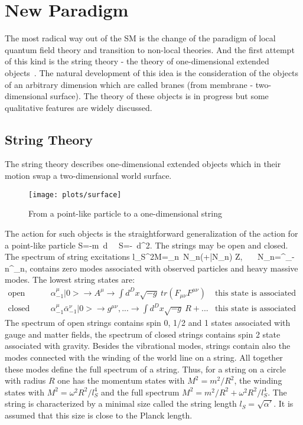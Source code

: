 \documentclass{cernyrep}
\begin{document}
\section{New Paradigm}
The most radical way out of the SM is the change of the paradigm of local quantum field theory and transition to non-local theories. And the first attempt of this kind is the string theory - the theory of one-dimensional  extended objects~\cite{string}. The natural development of this idea  is the consideration of the objects of an arbitrary dimension  which are called branes (from membrane - two-dimensional surface). The theory of these objects is in progress but some qualitative features are widely discussed.

\subsection{String Theory}
The string theory describes one-dimensional extended objects which in their motion swap a two-dimensional world surface. 
\begin{figure}[htb]\vspace{0.3cm}
\begin{center}
\leavevmode
\texttt{[image: plots/surface]}
\end{center}
\caption{From a point-like particle to a one-dimensional string}
\end{figure}
The action for such objects is the straightforward generalization of the action for a point-like particle
\beq
S=-m\int\ d\tau {} \ \Rightarrow \ 
S=-\int\ d^2\sigma {}.
\eeq 
The strings may be open and closed. The spectrum of string excitations 
\beq
l_S^2M=\sum_n\ N_n(+\bar N_n) \in Z, \ \ \ N_n=\alpha^\mu_{-n}\alpha^\mu_{n},
\eeq
 contains zero modes associated  with observed particles and heavy massive modes.  The lowest string states are:
$$ \begin{array}{lll}
 \mbox{open string} & \alpha^\mu_{-1}|0> \to A^\mu \to \int d^Dx \sqrt{-g}\ tr(F_{\mu\nu}F^{\mu\nu}) 
& \mbox{this state is associated with photon} \\
 \mbox{closed string }& \alpha^\mu_{-1} \bar \alpha^\nu_{-1}|0> \to  g^{\mu\nu}, ... \to \int d^Dx\sqrt{-g} \ R+ ...
 &  \mbox{this state is associated with graviton} 
 \end{array}$$
 The spectrum of open strings contains spin 0, 1/2 and 1 states associated with gauge and matter fields, the spectrum of closed strings contains spin 2 state associated with gravity. Besides the vibrational modes, strings contain also the modes connected with the winding  of the world line on a string. All together these modes define the full spectrum of a string. Thus, for a string on a circle with radius $R$ one has the  momentum states with $M^2=m^2/R^2$,  the winding states with $M^2=\omega^2 R^2/l_S^4$ and the full spectrum $M^2=m^2/R^2+\omega^2 R^2/l_S^4$. The string is characterized by a minimal size called the string length $l_S=\sqrt{\alpha'}$. It is assumed that this size is close to the Planck length.
\end{document}
